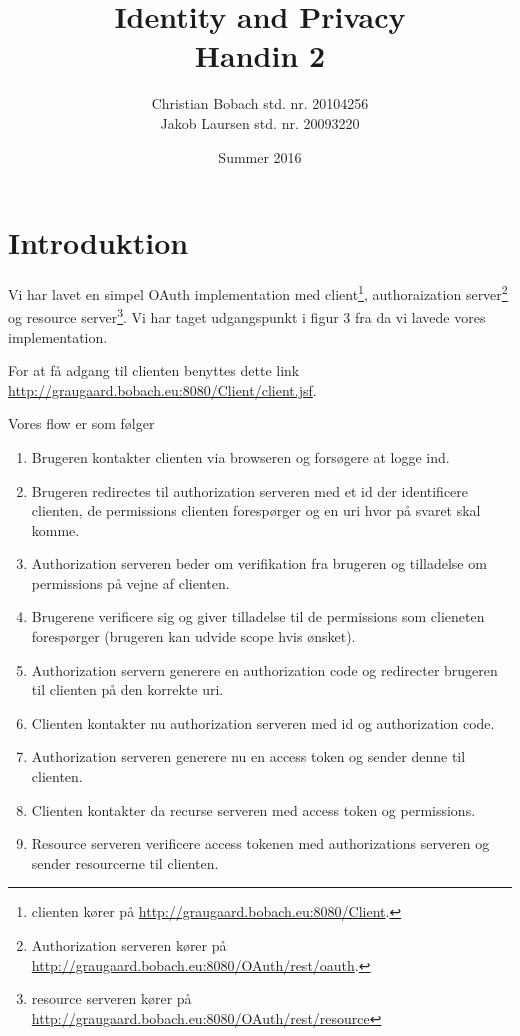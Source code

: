 \documentclass[a4paper,12pt]{article}
\title{Identity and Privacy \\Handin 2}
\author{Christian Bobach std. nr. 20104256\\Jakob Laursen std. nr. 20093220}
\date{Summer 2016}
\theoremstyle{plain}
\theoremstyle{nonumberplain}
\begin{document}
\maketitle
\section*{Introduktion}

Vi har lavet en simpel OAuth implementation med client\footnote{clienten kører på \url{http://graugaard.bobach.eu:8080/Client}.}, authoraization server\footnote{Authorization serveren kører på \url{http://graugaard.bobach.eu:8080/OAuth/rest/oauth}.} og resource server\footnote{resource serveren kører på \url{http://graugaard.bobach.eu:8080/OAuth/rest/resource}}. Vi har taget udgangspunkt i figur 3 fra \cite{iogp}  da vi lavede vores implementation.

For at få adgang til clienten benyttes dette link \url{http://graugaard.bobach.eu:8080/Client/client.jsf}.

Vores flow er som følger
\begin{enumerate}
    \item Brugeren kontakter clienten via browseren og forsøgere at logge ind.
    \item Brugeren redirectes til authorization serveren med et id der identificere clienten, de permissions clienten forespørger og en uri hvor på svaret skal komme.
    \item Authorization serveren beder om verifikation fra brugeren og tilladelse om permissions på vejne af clienten.
    \item Brugerene verificere sig og giver tilladelse til de permissions som clieneten forespørger (brugeren kan udvide scope hvis ønsket).
    \item Authorization servern generere en authorization code og redirecter brugeren til clienten på den korrekte uri.
    \item Clienten kontakter nu authorization serveren med id og authorization code.
    \item Authorization serveren generere nu en access token og sender denne til clienten.
    \item Clienten kontakter da recurse serveren med access token og permissions.
    \item Resource serveren verificere access tokenen med authorizations serveren og sender resourcerne til clienten.
\end{enumerate}
\end{document}
